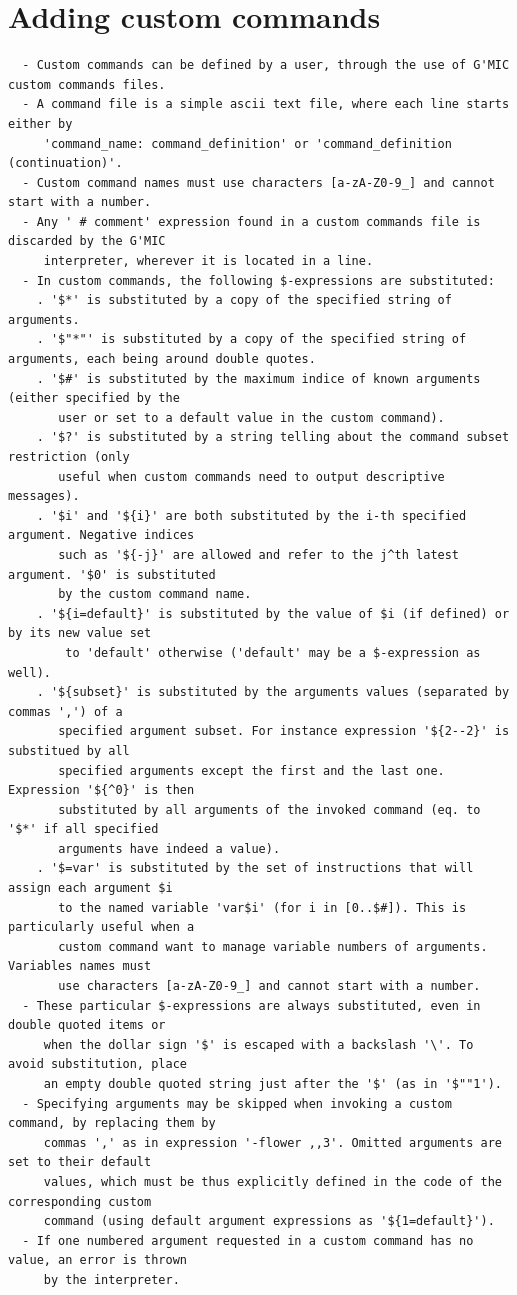 \documentclass[a4paper,11pt,twoside]{book}
\begin{document}
\section{Adding custom commands}
\small
\begin{lstlisting}
  - Custom commands can be defined by a user, through the use of G'MIC custom commands files. 
  - A command file is a simple ascii text file, where each line starts either by 
     'command_name: command_definition' or 'command_definition (continuation)'. 
  - Custom command names must use characters [a-zA-Z0-9_] and cannot start with a number. 
  - Any ' # comment' expression found in a custom commands file is discarded by the G'MIC 
     interpreter, wherever it is located in a line. 
  - In custom commands, the following $-expressions are substituted: 
    . '$*' is substituted by a copy of the specified string of arguments. 
    . '$"*"' is substituted by a copy of the specified string of arguments, each being around double quotes. 
    . '$#' is substituted by the maximum indice of known arguments (either specified by the 
       user or set to a default value in the custom command). 
    . '$?' is substituted by a string telling about the command subset restriction (only 
       useful when custom commands need to output descriptive messages). 
    . '$i' and '${i}' are both substituted by the i-th specified argument. Negative indices 
       such as '${-j}' are allowed and refer to the j^th latest argument. '$0' is substituted 
       by the custom command name. 
    . '${i=default}' is substituted by the value of $i (if defined) or by its new value set 
        to 'default' otherwise ('default' may be a $-expression as well). 
    . '${subset}' is substituted by the arguments values (separated by commas ',') of a 
       specified argument subset. For instance expression '${2--2}' is substitued by all 
       specified arguments except the first and the last one. Expression '${^0}' is then 
       substituted by all arguments of the invoked command (eq. to '$*' if all specified 
       arguments have indeed a value). 
    . '$=var' is substituted by the set of instructions that will assign each argument $i 
       to the named variable 'var$i' (for i in [0..$#]). This is particularly useful when a 
       custom command want to manage variable numbers of arguments. Variables names must 
       use characters [a-zA-Z0-9_] and cannot start with a number. 
  - These particular $-expressions are always substituted, even in double quoted items or 
     when the dollar sign '$' is escaped with a backslash '\'. To avoid substitution, place 
     an empty double quoted string just after the '$' (as in '$""1'). 
  - Specifying arguments may be skipped when invoking a custom command, by replacing them by 
     commas ',' as in expression '-flower ,,3'. Omitted arguments are set to their default 
     values, which must be thus explicitly defined in the code of the corresponding custom 
     command (using default argument expressions as '${1=default}'). 
  - If one numbered argument requested in a custom command has no value, an error is thrown 
     by the interpreter.
\end{lstlisting}
\normalsize
\end{document}
